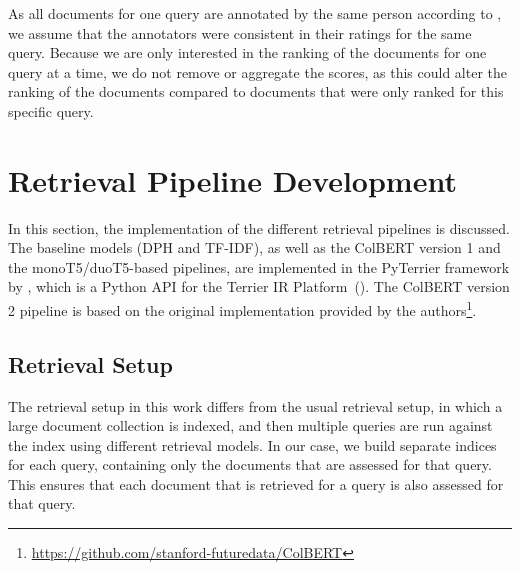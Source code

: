 As all documents for one query are annotated by the same person according to \cite{goeuriot:2021:Consumer}, we assume that the annotators were consistent in their ratings for the same query.
Because we are only interested in the ranking of the documents for one query at a time, we do not remove or aggregate the scores, as this could alter the ranking of the documents compared to documents that were only ranked for this specific query.

\section{Retrieval Pipeline Development}
In this section, the implementation of the different retrieval pipelines is discussed.
The baseline models (DPH and TF-IDF), as well as the ColBERT version 1 and the monoT5/duoT5-based pipelines, are implemented in the PyTerrier framework by \cite{pyterrier:2020:Declarative}, which is a Python API for the Terrier IR Platform~(\cite{macdonald:2012:From}).
The ColBERT version 2 pipeline is based on the original implementation provided by the authors\footnote{\url{https://github.com/stanford-futuredata/ColBERT}}.

\subsection{Retrieval Setup}
The retrieval setup in this work differs from the usual retrieval setup, in which a large document collection is indexed, and then multiple queries are run against the index using different retrieval models.
In our case, we build separate indices for each query, containing only the documents that are assessed for that query.
This ensures that each document that is retrieved for a query is also assessed for that query.

